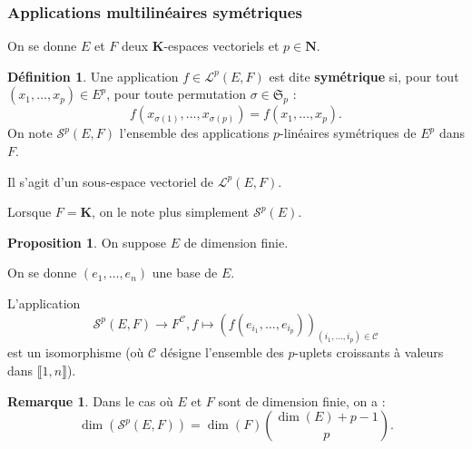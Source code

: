 \documentclass[12pt,a4paper]{article}
\theoremstyle{definition}
\newtheorem{prop}[thm]{Proposition}
\newtheorem{defn}[thm]{Définition}
\newtheorem{rqe}[thm]{Remarque}
\begin{document}
\subsubsection{Applications multilinéaires symétriques}
On se donne $E$ et $F$ deux $\mathbf{K}$-espaces vectoriels et $p\in\mathbf{N}$.
\begin{defn}
Une application $f\in\mathcal{L}^p(E,F)$ est dite \textbf{symétrique} si, pour tout $(x_1,\ldots,x_p)\in E^p$, pour toute permutation $\sigma\in\mathfrak{S}_p$ :
$$
f\left(x_{\sigma (1)},\ldots,x_{\sigma(p)}\right)=f(x_1,\ldots,x_p).
$$
On note $\mathcal{S}^p(E,F)$ l'ensemble des applications $p$-linéaires symétriques de $E^p$ dans $F$.

Il s'agit d'un sous-espace vectoriel de $\mathcal{L}^p(E,F)$.

Lorsque $F=\mathbf{K}$, on le note plus simplement $\mathcal{S}^p(E)$.
\end{defn}
\begin{prop}
On suppose $E$ de dimension finie.

On se donne $(e_1,\ldots,e_n)$ une base de $E$.

L'application 
$$
\mathcal{S}^p(E,F)\to F^{\mathcal{C}},f\mapsto \left(f\left(e_{i_1},\ldots,e_{i_p}\right)\right)_{(i_1,\ldots,i_p)\in\mathcal{C}}
$$ est un isomorphisme (où $\mathcal{C}$ désigne l'ensemble des $p$-uplets croissants à valeurs dans $\llbracket 1,n\rrbracket$).
\end{prop}
\begin{rqe}
Dans le cas où $E$ et $F$ sont de dimension finie, on a :
$$\dim(\mathcal{S}^p(E,F))=\dim(F)\binom{\dim(E)+p-1}{p}.$$
\end{rqe}
\newpage
\end{document}
